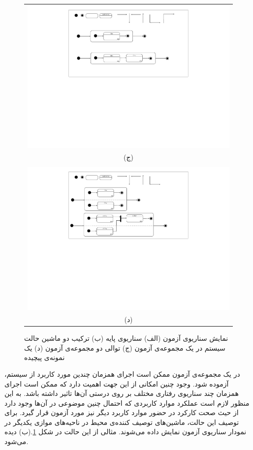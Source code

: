 \begin{figure}
\begin{center}
\begin{tabular}{| c |}
	\includegraphics[width=14cm]{4-ProposedFramework/Figures/TS-3.pdf}
	\\
	(ج)
	\\
	\hline
	\\
	\includegraphics[width=14cm]{4-ProposedFramework/Figures/TS-4.pdf} 
	\\
	(د)
	\\
	\hline
  \end{tabular}
  \end{center}
   \caption{\label{fig:TS} نمایش سناریوی آزمون (الف) سناریوی پایه (ب) ترکیب دو ماشین حالت سیستم در یک مجموعه‌ی آزمون (ج) توالی دو مجموعه‌ی آزمون (د) یک نمونه‌ی پیچیده }
\end{figure}

در یک مجموعه‌ی آزمون ممکن است اجرای همزمان چندین مورد کاربرد از سیستم، آزموده شود. وجود چنین امکانی از این جهت اهمیت دارد که ممکن است اجرای همزمان چند سناریوی رفتاری مختلف بر روی درستی آن‌ها تاثیر داشته باشد. به این منظور لازم است عملکرد موارد کاربردی که احتمال چنین موضوعی در آن‌ها وجود دارد از  حیث صحت کارکرد در حضور موارد کاربرد دیگر نیز مورد آزمون قرار گیرد. برای توصیف این حالت، ماشین‌های توصیف کننده‌ی محیط در ناحیه‌های موازی یکدیگر در نمودار سناریوی آزمون نمایش داده می‌شوند. مثالی از این حالت در شکل \ref{fig:TS}.(ب) دیده می‌شود.

